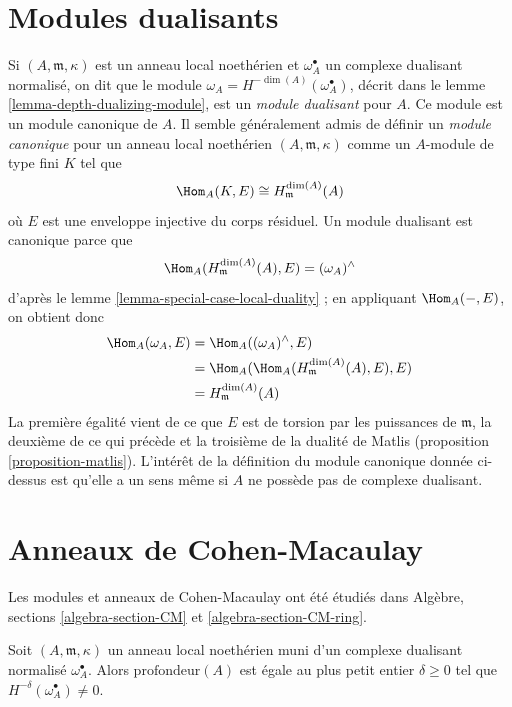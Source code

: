 \section{Modules dualisants}
\label{section-dualizing-module}

\noindent
Si $(A, \mathfrak m, \kappa)$ est un anneau local noethérien et $\omega_A^\bullet$ un complexe dualisant normalisé,
on dit que le module $\omega_A = H^{-\dim(A)}(\omega_A^\bullet)$, décrit dans le lemme \ref{lemma-depth-dualizing-module},
est un {\it module dualisant} pour $A$.
Ce module est un module canonique de $A$.
Il semble généralement admis de définir un {\it module canonique}
pour un anneau local noethérien $(A, \mathfrak m, \kappa)$ comme un $A$-module de type fini
$K$ tel que
$$
\Hom_A(K, E) \cong H^{\dim(A)}_\mathfrak m(A)
$$
où $E$ est une enveloppe injective du corps résiduel.
Un module dualisant est canonique parce que
$$
\Hom_A(H^{\dim(A)}_\mathfrak m(A), E) = (\omega_A)^\wedge
$$
d'après le lemme \ref{lemma-special-case-local-duality} ; en appliquant $\Hom_A(-, E)$, on obtient donc
\begin{align*}
\Hom_A(\omega_A, E)
& =
\Hom_A((\omega_A)^\wedge, E) \\
& =
\Hom_A(\Hom_A(H^{\dim(A)}_\mathfrak m(A), E), E) \\
& = H^{\dim(A)}_\mathfrak m(A)
\end{align*}
La première égalité vient de ce que $E$ est de torsion par les puissances
de $\mathfrak m$, la deuxième de ce qui précède et la troisième de la dualité de Matlis
(proposition \ref{proposition-matlis}).
L'intérêt de la définition du module canonique donnée ci-dessus
est qu'elle a un sens même si $A$ ne possède pas de complexe dualisant.




\section{Anneaux de Cohen-Macaulay}
\label{section-CM}

\noindent
Les modules et anneaux de Cohen-Macaulay ont été étudiés dans
Algèbre, sections \ref{algebra-section-CM} et \ref{algebra-section-CM-ring}.

\begin{lemma}
\label{lemma-depth-in-terms-dualizing-complex}
Soit $(A, \mathfrak m, \kappa)$ un anneau local noethérien muni d'un complexe dualisant normalisé $\omega_A^\bullet$.
Alors $\text{profondeur}(A)$ est égale au plus petit entier $\delta \geq 0$ tel que $H^{-\delta}(\omega_A^\bullet) \not = 0$.
\end{lemma}

